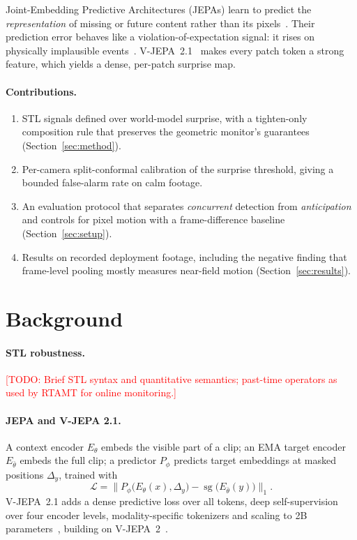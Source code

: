 \documentclass[11pt]{article}
\newcommand{\todo}[1]{\textcolor{red}{[TODO: #1]}}
\begin{document}
Joint-Embedding Predictive Architectures (JEPAs) learn to predict the
\emph{representation} of missing or future content rather than its
pixels~\citep{lecun2022path,assran2023ijepa,bardes2024vjepa}. Their prediction
error behaves like a violation-of-expectation signal: it rises on physically
implausible events~\citep{garrido2025intuitive}. V-JEPA~2.1~\citep{murlabadia2026vjepa21}
makes every patch token a strong feature, which yields a dense, per-patch
surprise map.

\paragraph{Contributions.}
\begin{enumerate}
  \item STL signals defined over world-model surprise, with a tighten-only
        composition rule that preserves the geometric monitor's guarantees
        (Section~\ref{sec:method}).
  \item Per-camera split-conformal calibration of the surprise threshold,
        giving a bounded false-alarm rate on calm footage.
  \item An evaluation protocol that separates \emph{concurrent} detection from
        \emph{anticipation} and controls for pixel motion with a frame-difference
        baseline (Section~\ref{sec:setup}).
  \item Results on recorded deployment footage, including the negative finding
        that frame-level pooling mostly measures near-field motion
        (Section~\ref{sec:results}).
\end{enumerate}

\section{Background}
\label{sec:background}

\paragraph{STL robustness.} \todo{Brief STL syntax and quantitative semantics;
past-time operators as used by RTAMT for online monitoring.}

\paragraph{JEPA and V-JEPA 2.1.} A context encoder $E_\theta$ embeds the
visible part of a clip; an EMA target encoder $E_{\bar\theta}$ embeds the full
clip; a predictor $P_\phi$ predicts target embeddings at masked positions
$\Delta_y$, trained with
\begin{equation}
  \mathcal{L} = \bigl\lVert P_\phi\bigl(E_\theta(x), \Delta_y\bigr)
                - \operatorname{sg}\bigl(E_{\bar\theta}(y)\bigr) \bigr\rVert_1 .
\end{equation}
V-JEPA~2.1 adds a dense predictive loss over all tokens, deep self-supervision
over four encoder levels, modality-specific tokenizers and scaling to
2B parameters~\citep{murlabadia2026vjepa21}, building on
V-JEPA~2~\citep{assran2025vjepa2}.
\end{document}
